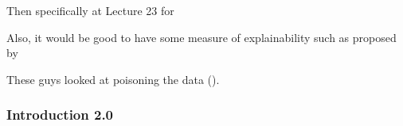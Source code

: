 Then specifically at Lecture 23 for 


Also, it would be good to have some measure of explainability such as proposed by 
\cite{Zeiler:2014}

These guys looked at poisoning the data (\cite{bansal2018chauffeurnet}).

\subsubsection{Introduction 2.0}

